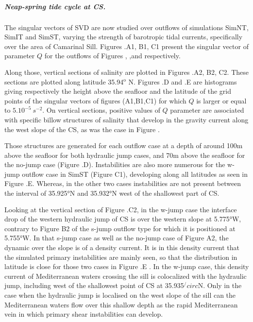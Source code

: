 \subparagraph{Neap-spring tide cycle at CS.}
The singular vectors of SVD are now studied over outflows of simulations SimNT, SimIT and SimST, varying the strength of barotropic tidal currents, specifically over the area of Camarinal Sill. Figures .A1, B1, C1 present the singular vector of parameter $Q$ for the outflows of Figures , ,and  respectively.

Along those, vertical sections of salinity are plotted in Figures .A2, B2, C2. These sections are plotted along latitude 35.94$^\text{o}$ N. Figures .D and .E are histograms giving respectively the height above the seafloor and the latitude of the grid points of the singular vectors of figures (A1,B1,C1) for which $Q$ is larger or equal to $5.10^{-5}\ s^{-2}$. On vertical sections, positive values of $Q$ parameter are associated with specific billow structures of salinity that develop in the gravity current along the west slope of the CS, as was the case in Figure . 

Those structures are generated for each outflow case at a depth of around 100m above the seafloor for both hydraulic jump cases, and 70m above the seafloor for the no-jump case (Figure .D). Instabilities are also more numerous for the w-jump outflow case in SimST (Figure C1), developing along all latitudes as seen in Figure .E. Whereas, in the other two cases instabilities are not present between the interval of 35.925°N and 35.932°N west of the shallowest part of CS.

Looking at the vertical section of Figure .C2, in the w-jump case the interface drop of the western hydraulic jump of CS is over the western slope at 5.775°W, contrary to Figure B2 of the s-jump outflow type for which it is positioned at 5.755°W. In that s-jump case as well as the no-jump case of Figure A2, the dynamic over the slope is of a density current.\color{red} It is in this density current that the simulated primary instabilities are mainly seen, so that the distribution in latitude is close for those two cases in Figure .E \color{black}. In the w-jump case, this density current of Mediterranean waters crossing the sill is colocalized with the hydraulic jump, including west of the shallowest point of CS at 35.935$^/circ$N. Only in the case when the hydraulic jump is localised on the west slope of the sill can the Mediterranean waters flow over this shallow depth as the rapid Mediterranean vein in which primary shear instabilities can develop. 

